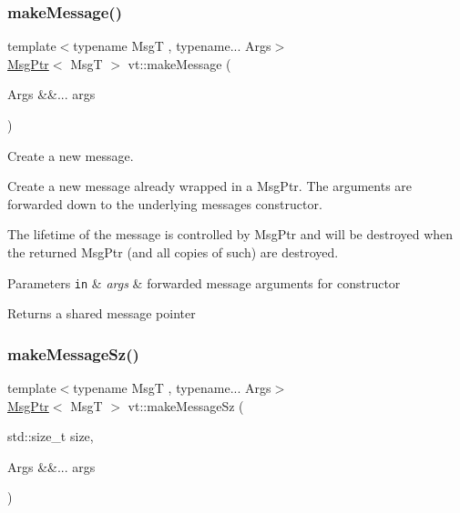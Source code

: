 \mbox{\label{namespacevt_a948c0bbe39c34326b5453065a461ebaa}} 
\subsubsection{\texorpdfstring{make\+Message()}{makeMessage()}}
{\footnotesize\ttfamily template$<$typename MsgT , typename... Args$>$ \\
\hyperlink{namespacevt_a9f5ebd62ee9d6dd8829e3e1cc4f858e9}{Msg\+Ptr}$<$ MsgT $>$ vt\+::make\+Message (\begin{DoxyParamCaption}\item[{Args \&\&...}]{args }\end{DoxyParamCaption})}



Create a new message. 

Create a new message already wrapped in a Msg\+Ptr. The arguments are forwarded down to the underlying message\textquotesingle{}s constructor.

The lifetime of the message is controlled by Msg\+Ptr and will be destroyed when the returned Msg\+Ptr (and all copies of such) are destroyed.


\begin{DoxyParams}[1]{Parameters}
\mbox{\tt in}  & {\em args} & forwarded message arguments for constructor\\
\hline
\end{DoxyParams}
\begin{DoxyReturn}{Returns}
a shared message pointer 
\end{DoxyReturn}
\mbox{\label{namespacevt_a02d4a45f1b229ac6fd5da4bf289d6654}} 
\subsubsection{\texorpdfstring{make\+Message\+Sz()}{makeMessageSz()}}
{\footnotesize\ttfamily template$<$typename MsgT , typename... Args$>$ \\
\hyperlink{namespacevt_a9f5ebd62ee9d6dd8829e3e1cc4f858e9}{Msg\+Ptr}$<$ MsgT $>$ vt\+::make\+Message\+Sz (\begin{DoxyParamCaption}\item[{std\+::size\+\_\+t}]{size,  }\item[{Args \&\&...}]{args }\end{DoxyParamCaption})}



